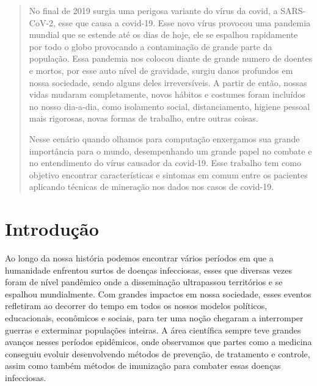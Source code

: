 \documentclass[tcc1]{uftex}
\begin{document}
  \begin{abstract}
  \setlength{\parindent}{1.25cm}
    No final de 2019 surgia uma perigosa variante do vírus da covid, a SARS-CoV-2, esse que causa a covid-19. Esse novo vírus provocou uma pandemia mundial que se estende até os dias de hoje, ele se espalhou rapidamente por todo o globo provocando a contaminação de grande parte da população. Essa pandemia nos colocou diante de grande numero de doentes e mortos, por esse auto nível de gravidade, surgiu danos profundos em nossa sociedade, sendo alguns deles irreversíveis. A partir de então, nossas vidas mudaram completamente, novos hábitos e costumes foram incluídos no nosso dia-a-dia, como isolamento social, distanciamento, higiene pessoal mais rigorosas, novas formas de trabalho, entre outras coisas.
    
    Nesse cenário quando olhamos para computação enxergamos sua grande importância para o mundo, desempenhando um grande papel no combate e no entendimento do vírus causador da covid-19. Esse trabalho tem como objetivo encontrar características e sintomas em comum entre os pacientes aplicando técnicas de mineração nos dados nos casos de covid-19.  
  \end{abstract}

  
  \printlosymbols  
  \printloabbreviations
  \listoffigures
  \listoftables 
  \tableofcontents %
\mainmatter
\onehalfspacing
\chapter{Introdução}

Ao longo da nossa história podemos encontrar vários períodos em que a humanidade enfrentou surtos de doenças infecciosas, esses que diversas vezes foram de nível pandêmico onde a disseminação ultrapassou territórios e se espalhou mundialmente. Com grandes impactos em nossa sociedade, esses eventos refletiram ao decorrer do tempo em todos os nossos modelos políticos, educacionais, econômicos e sociais, para ter uma noção chegaram a interromper guerras e exterminar populações inteiras.\cite{huremovic2019brief} A área científica sempre teve grandes avanços nesses períodos epidêmicos, onde observamos que partes como a medicina conseguiu evoluir desenvolvendo métodos de prevenção, de tratamento e controle, assim como também métodos de imunização para combater essas doenças infecciosas.
	
\end{document}
